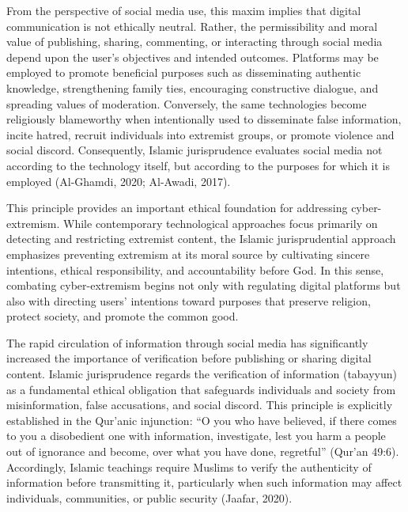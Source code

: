 \documentclass{NSP1}
\begin{document}
From the perspective of social media use, this maxim implies that digital communication is not ethically neutral. Rather, the permissibility and moral value of publishing, sharing, commenting, or interacting through social media depend upon the user's objectives and intended outcomes. Platforms may be employed to promote beneficial purposes such as disseminating authentic knowledge, strengthening family ties, encouraging constructive dialogue, and spreading values of moderation. Conversely, the same technologies become religiously blameworthy when intentionally used to disseminate false information, incite hatred, recruit individuals into extremist groups, or promote violence and social discord. Consequently, Islamic jurisprudence evaluates social media not according to the technology itself, but according to the purposes for which it is employed (Al-Ghamdi, 2020; Al-Awadi, 2017).

This principle provides an important ethical foundation for addressing cyber-extremism. While contemporary technological approaches focus primarily on detecting and restricting extremist content, the Islamic jurisprudential approach emphasizes preventing extremism at its moral source by cultivating sincere intentions, ethical responsibility, and accountability before God. In this sense, combating cyber-extremism begins not only with regulating digital platforms but also with directing users' intentions toward purposes that preserve religion, protect society, and promote the common good.

\par\medskip{}\smallskip

The rapid circulation of information through social media has significantly increased the importance of verification before publishing or sharing digital content. Islamic jurisprudence regards the verification of information (tabayyun) as a fundamental ethical obligation that safeguards individuals and society from misinformation, false accusations, and social discord. This principle is explicitly established in the Qur'anic injunction: “O you who have believed, if there comes to you a disobedient one with information, investigate, lest you harm a people out of ignorance and become, over what you have done, regretful” (Qur'an 49:6). Accordingly, Islamic teachings require Muslims to verify the authenticity of information before transmitting it, particularly when such information may affect individuals, communities, or public security (Jaafar, 2020).
\end{document}
